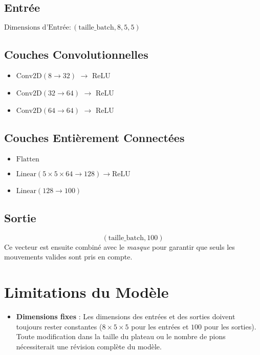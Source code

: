 \documentclass[]{article}
\begin{document}
\subsection{Entrée}
\(\text{Dimensions d'Entrée}: (\text{taille\_batch}, 8, 5, 5)\)

\subsection{Couches Convolutionnelles}
\begin{itemize}
    \item \(\text{Conv2D}(8 \rightarrow 32)\) \(\rightarrow\) ReLU
    \item \(\text{Conv2D}(32 \rightarrow 64)\) \(\rightarrow\) ReLU
    \item \(\text{Conv2D}(64 \rightarrow 64)\) \(\rightarrow\) ReLU
\end{itemize}

\subsection{Couches Entièrement Connectées}
\begin{itemize}
    \item \(\text{Flatten}\)
    \item \(\text{Linear}(5 \times 5 \times 64 \rightarrow 128) \rightarrow \text{ReLU}\)
    \item \(\text{Linear}(128 \rightarrow 100)\)
\end{itemize}

\subsection{Sortie}
\[
(\text{taille\_batch}, 100)
\]
Ce vecteur est ensuite combiné avec le \textit{masque} pour garantir que seuls les mouvements valides sont pris en compte.

\section{Limitations du Modèle}
\begin{itemize}
    \item \textbf{Dimensions fixes} : Les dimensions des entrées et des sorties doivent toujours rester constantes (\(8 \times 5 \times 5\) pour les entrées et \(100\) pour les sorties). Toute modification dans la taille du plateau ou le nombre de pions nécessiterait une révision complète du modèle.
\end{itemize}
\end{document}
